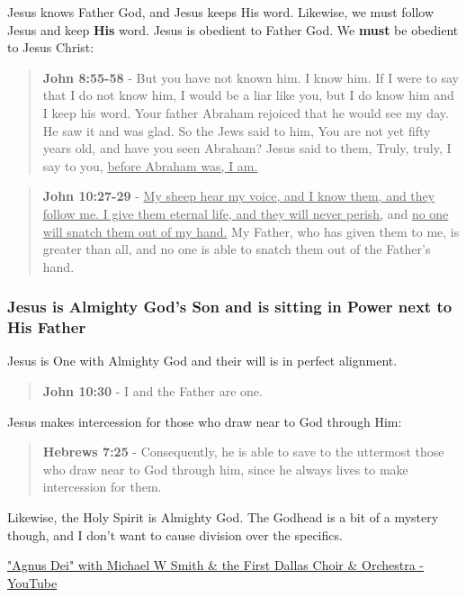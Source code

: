 \documentclass[11pt]{article}
\begin{document}
Jesus knows Father God, and Jesus keeps His word. Likewise, we must follow Jesus and keep \textbf{His} word. Jesus is obedient to Father God. We \textbf{must} be obedient to Jesus Christ:

\begin{quote}
\textbf{John 8:55-58} - But you have not known him. I know him. If I were to say that I do not know him, I would be a liar like you, but I do know him and I keep his word. Your father Abraham rejoiced that he would see my day. He saw it and was glad. So the Jews said to him, You are not yet fifty years old, and have you seen Abraham? Jesus said to them, Truly, truly, I say to you, \uline{before Abraham was, I am.}
\end{quote}

\begin{quote}
\textbf{John 10:27-29} - \uline{My sheep hear my voice, and I know them, and they follow me. I give them eternal life, and they will never perish,} and \uline{no one will snatch them out of my hand.} My Father, who has given them to me, is greater than all, and no one is able to snatch them out of the Father's hand.
\end{quote}

\subsubsection{Jesus is Almighty God's Son and is sitting in Power next to His Father}
\label{sec:orgdc8f4d6}
Jesus is One with Almighty God and their will is in perfect alignment.

\begin{quote}
\textbf{John 10:30} - I and the Father are one.
\end{quote}

Jesus makes intercession for those who draw near to God through Him:

\begin{quote}
\textbf{Hebrews 7:25} - Consequently, he is able to save to the uttermost those who draw near to God through him, since he always lives to make intercession for them.
\end{quote}

Likewise, the Holy Spirit is Almighty God. The Godhead is a bit of a mystery though, and I don't want to cause division over the specifics.

\href{https://www.youtube.com/watch?v=db0t\_NUq5bw}{"Agnus Dei" with Michael W  Smith \& the First Dallas Choir \& Orchestra - YouTube}
\end{document}
